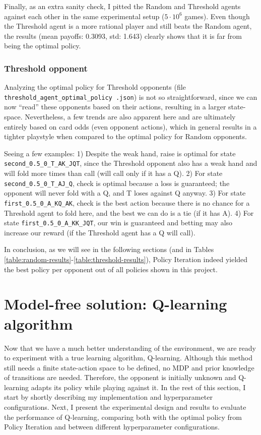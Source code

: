 Finally, as an extra sanity check, I pitted the Random and Threshold agents against each other in the same experimental setup ($5\cdot10^6$ games). Even though the Threshold agent is a more rational player and still beats the Random agent, the results (mean payoffs: 0.3093, std: 1.643) clearly shows that it is far from being the optimal policy.

\subsubsection{Threshold opponent}

Analyzing the optimal policy for Threshold opponents (file \texttt{threshold\_agent\_optimal\_policy .json}) is not so straightforward, since we can now ``read'' these opponents based on their actions, resulting in a larger state-space. Nevertheless, a few trends are also apparent here and are ultimately entirely based on card odds (even opponent actions), which in general results in a tighter playstyle when compared to the optimal policy for Random opponents. 

Seeing a few examples: 1) Despite the weak hand, raise is optimal for state \Verb|second_0.5_0_T_AK_JQT|, since the Threshold opponent also has a weak hand and will fold more times than call (will call only if it has a Q). 2) For state \Verb|second_0.5_0_T_AJ_Q|, check is optimal because a loss is guaranteed; the opponent will never fold with a Q, and T loses against Q anyway. 3) For state \Verb|first_0.5_0_A_KQ_AK|, check is the best action because there is no chance for a Threshold agent to fold here, and the best we can do is a tie (if it has A). 4) For state \Verb|first_0.5_0_A_KK_JQT|, our win is guaranteed and betting may also increase our reward (if the Threshold agent has a Q will call).

In conclusion, as we will see in the following sections (and in Tables \ref{table:random-results}-\ref{table:threshold-results}), Policy Iteration indeed yielded the best policy per opponent out of all policies shown in this project.

\section{Model-free solution: Q-learning algorithm}

Now that we have a much better understanding of the environment, we are ready to experiment with a true learning algorithm, Q-learning. Although this method still needs a finite state-action space to be defined, no MDP and prior knowledge of transitions are needed. Therefore, the opponent is initially unknown and Q-learning adapts its policy while playing against it. In the rest of this section, I start by shortly describing my implementation and hyperparameter configurations. Next, I present the experimental design and results to evaluate the performance of Q-learning, comparing both with the optimal policy from Policy Iteration and between different hyperparameter configurations.

